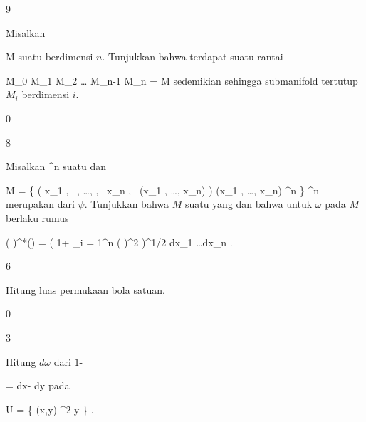 {9}
{

Misalkan

\mavergleichskette
{\vergleichskette
{ M
}
{ \neq }{ \emptyset
}
{  }{
}
{    }{
}
{   }{
}
}
{}{}{}
suatu
berdimensi $n$. Tunjukkan bahwa terdapat suatu rantai

\mavergleichskettedisp
{\vergleichskette
{ M_0
}
{ \subseteq} { M_1
}
{ \subseteq} { M_2
}
{ \subseteq  \ldots \subseteq} { M_{n-1}
}
{ \subseteq} { M_n
}
}
{
\vergleichskettefortsetzung
{ =} { M
}
{ } {}
{ } {}
{ } {}
}{}{}
sedemikian sehingga submanifold tertutup $M_i$ berdimensi $i$.

}
{} {}

{0}
{

}
{} {}

{8}
{

Misalkan
\maabbdisp {\psi} {\R^n } {\R
} {}
suatu
dan

\mavergleichskettedisphandlinks
{\vergleichskettedisphandlinks
{M
}
{ =} { \left\{  \left(  x_1   , \,   , \ldots ,  , \,   x_n , \,   \psi(x_1 , \ldots , x_n)                \right)   \mid  (x_1 , \ldots , x_n) \in \R^n         \right\}
}
{ \subseteq} { \R^n \times \R
}
{ } {
}
{ } {
}
}
{}{}{}
merupakan
dari $\psi$. Tunjukkan bahwa $M$ suatu
yang
dan bahwa untuk
$\omega$ pada $M$ berlaku rumus

\mavergleichskettedisp
{\vergleichskette
{ ( \times \psi)^*(\omega)
}
{ =} { \left(  1+ \sum_{i = 1}^n \left(  {  }  \right)^2  \right)^{1/2} dx_1 \wedge \ldots \wedge dx_n
}
{ } {
}
{ } {
}
{ } {
}
}
{}{}{.}

}
{} {}

{6}
{

Hitung luas permukaan bola satuan.

}
{} {}

{0}
{

}
{} {}

{3}
{

Hitung
$d \omega$ dari
$1$-

\mavergleichskettedisp
{\vergleichskette
{ \omega
}
{ =} { {  } dx- {  } dy
}
{ } {
}
{ } {
}
{ } {
}
}
{}{}{}
pada

\mavergleichskette
{\vergleichskette
{ U
}
{ = }{ \left\{ (x,y) \in \R^2  \mid   y          \right\}
}
{  }{
}
{    }{
}
{   }{
}
}
{}{}{.}

}
{} {}

